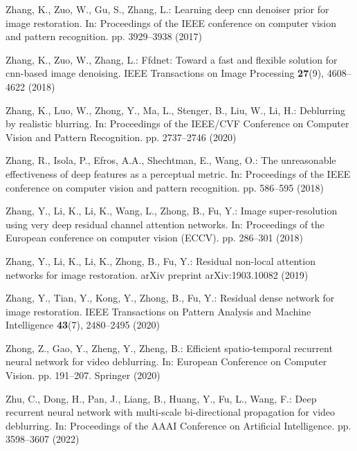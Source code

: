 \documentclass[runningheads]{llncs}
\begin{document}
\begin{thebibliography}{10}
Zhang, K., Zuo, W., Gu, S., Zhang, L.: Learning deep cnn denoiser prior for
  image restoration. In: Proceedings of the IEEE conference on computer vision
  and pattern recognition. pp. 3929--3938 (2017)

Zhang, K., Zuo, W., Zhang, L.: Ffdnet: Toward a fast and flexible solution for
  cnn-based image denoising. IEEE Transactions on Image Processing
  \textbf{27}(9),  4608--4622 (2018)

Zhang, K., Luo, W., Zhong, Y., Ma, L., Stenger, B., Liu, W., Li, H.: Deblurring
  by realistic blurring. In: Proceedings of the IEEE/CVF Conference on Computer
  Vision and Pattern Recognition. pp. 2737--2746 (2020)

Zhang, R., Isola, P., Efros, A.A., Shechtman, E., Wang, O.: The unreasonable
  effectiveness of deep features as a perceptual metric. In: Proceedings of the
  IEEE conference on computer vision and pattern recognition. pp. 586--595
  (2018)

Zhang, Y., Li, K., Li, K., Wang, L., Zhong, B., Fu, Y.: Image super-resolution
  using very deep residual channel attention networks. In: Proceedings of the
  European conference on computer vision (ECCV). pp. 286--301 (2018)

Zhang, Y., Li, K., Li, K., Zhong, B., Fu, Y.: Residual non-local attention
  networks for image restoration. arXiv preprint arXiv:1903.10082  (2019)

Zhang, Y., Tian, Y., Kong, Y., Zhong, B., Fu, Y.: Residual dense network for
  image restoration. IEEE Transactions on Pattern Analysis and Machine
  Intelligence  \textbf{43}(7),  2480--2495 (2020)

Zhong, Z., Gao, Y., Zheng, Y., Zheng, B.: Efficient spatio-temporal recurrent
  neural network for video deblurring. In: European Conference on Computer
  Vision. pp. 191--207. Springer (2020)

Zhu, C., Dong, H., Pan, J., Liang, B., Huang, Y., Fu, L., Wang, F.: Deep
  recurrent neural network with multi-scale bi-directional propagation for
  video deblurring. In: Proceedings of the AAAI Conference on Artificial
  Intelligence. pp. 3598--3607 (2022)

\end{thebibliography}
 
\end{document}
